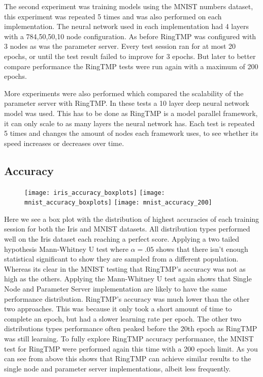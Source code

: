 The second experiment was training models using the MNIST numbers dataset, this
experiment was repeated 5 times and was also performed on each implementation.
The neural network used in each implementation had 4 layers with a 784,50,50,10
node configuration. As before RingTMP was configured with 3 nodes as was the
parameter server. Every test session ran for at most 20 epochs, or until the
test result failed to improve for 3 epochs. But later to better compare
performance the RingTMP tests were run again with a maximum of 200 epochs.

More experiments were also performed which compared the scalability of the
parameter server with RingTMP. In these tests a 10 layer deep neural network
model was used. This has to be done as RingTMP is a model parallel framework, it
can only scale to as many layers the neural network has. Each test is repeated 5
times and changes the amount of nodes each framework uses, to see whether its
speed increases or decreases over time.

 

\subsection{Accuracy}

\begin{figure}[h]
    \centering
    \texttt{[image: iris\_accuracy\_boxplots]}
    \texttt{[image: mnist\_accuracy\_boxplots]}
    \texttt{[image: mnist\_accuracy\_200]}
\end{figure}

Here we see a box plot with the distribution of highest accuracies of each
training session for both the Iris and MNIST datasets. All distribution types
performed well on the Iris dataset each reaching a perfect score. Applying a two
tailed hypothesis Mann-Whitney U test where \(\alpha = .05\) shows that there
isn't enough statistical significant to show they are sampled from a different
population. Whereas its clear in the MNIST testing that RingTMP's accuracy was
not as high as the others. Applying the Mann-Whitney U test again shows that
Single Node and Parameter Server implementation are likely to have the same
performance distribution. RingTMP's accuracy was much lower than the other two
approaches. This was because it only took a short amount of time to complete an
epoch, but had a slower learning rate per epoch. The other two distributions
types performance often peaked before the 20th epoch as RingTMP was still
learning. To fully explore RingTMP accuracy performance, the MNIST test for
RingTMP were performed again this time with a 200 epoch limit. As you can see
from above this shows that RingTMP can achieve similar results to the single
node and parameter server implementations, albeit less frequently.

